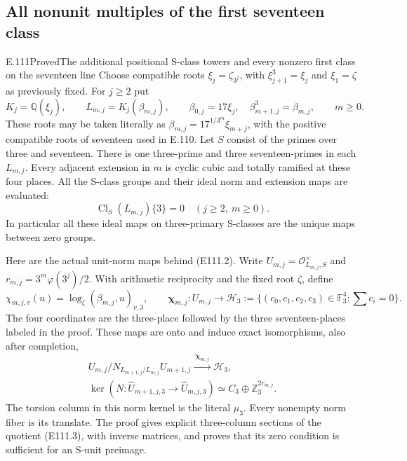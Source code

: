 \subsection{All nonunit multiples of the first seventeen class}

\begin{statement}{E.111}{Proved}{The additional positional S-class towers and every nonzero first class on the seventeen line}
Choose compatible roots $\xi_j=\zeta_{3^j}$, with
$\xi_{j+1}^3=\xi_j$ and $\xi_1=\zeta$ as previously fixed.
For $j\ge2$ put
\[
 K_j=\mathbb Q(\xi_j),\qquad
 L_{m,j}=K_j(\beta_{m,j}),\qquad
 \beta_{0,j}=17\xi_j,\quad
 \beta_{m+1,j}^3=\beta_{m,j},\qquad m\ge0.
 \tag{E111.1}
\]
These roots may be taken literally as
$\beta_{m,j}=17^{1/3^m}\xi_{m+j}$, with the positive
compatible roots of seventeen used in E.110.
Let $S$ consist of the primes over three and seventeen.
There is one three-prime and three seventeen-primes in each
$L_{m,j}$. Every adjacent extension in $m$ is cyclic cubic
and totally ramified at these four places. All the S-class
groups and their ideal norm and extension maps are evaluated:
\[
 \operatorname{Cl}_S(L_{m,j})\{3\}=0
                    \quad(j\ge2,\ m\ge0).
 \tag{E111.2}
\]
In particular all these ideal maps on three-primary S-classes
are the unique maps between zero groups.

Here are the actual unit-norm maps behind (E111.2).
Write $U_{m,j}=\mathcal O_{L_{m,j},S}^{\times}$ and
$r_{m,j}=3^m\varphi(3^j)/2$. With arithmetic reciprocity and
the fixed root $\zeta$, define
\[
 \chi_{m,j,v}(u)=
     \log_\zeta(\beta_{m,j},u)_{v,3},\qquad
 \boldsymbol\chi_{m,j}:U_{m,j}\longrightarrow
 \mathcal H_3:=\{(c_0,c_1,c_2,c_3)\in\mathbb F_3^4:
                                   \textstyle\sum c_i=0\}.
 \tag{E111.3}
\]
The four coordinates are the three-place followed by the
three seventeen-places labeled in the proof. These maps are
onto and induce exact isomorphisms, also after completion,
\[
 \begin{gathered}
 U_{m,j}/N_{L_{m+1,j}/L_{m,j}}U_{m+1,j}
       \xrightarrow{\ \boldsymbol\chi_{m,j}\ }\mathcal H_3,
 \\
 \ker\!\left(N:\widehat U_{m+1,j,3}
                     \longrightarrow\widehat U_{m,j,3}\right)
       \simeq C_3\oplus\mathbb Z_3^{2r_{m,j}}.
 \end{gathered}
 \tag{E111.4}
\]
The torsion column in this norm kernel is the literal $\mu_3$.
Every nonempty norm fiber is its translate. The proof gives
explicit three-column sections of the quotient (E111.3),
with inverse matrices, and proves that its zero condition
is sufficient for an S-unit preimage.


\end{statement}
